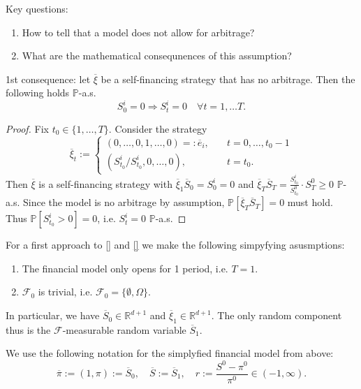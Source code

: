 \begin{prob}Key questions:
\begin{enumerate}
    \item How to tell that a model does not allow for arbitrage? 
    \item What are the mathematical consequnences of this assumption?
\end{enumerate}
\end{prob}

\begin{rem}
1st consequence: let $\overline \xi$ be a self-financing strategy that has no arbitrage. Then the following holds $\mathbb P$-a.s.
$$S_0^i =0 \Rightarrow S_t^i=0\quad\forall t=1,\ldots T.$$
\end{rem}

\begin{proof}
Fix $t_0\in\{1,\ldots,T\}$. Consider the strategy
\begin{equation*}
\overline \xi_t := 
\begin{cases}
(0,\ldots, 0, 1, \ldots, 0) =: \overline e_i,\quad &t=0, \ldots, t_0-1\\
(S_{t_0}^i/S_{t_0}^i, 0, \ldots, 0), & t=t_0.
\end{cases}
\end{equation*}
Then $\overline \xi$ is a self-financing strategy with $\overline \xi_1 \overline S_0 = S_0^i = 0$ and $\overline \xi_T \overline S_T = \frac{S_{t_0}^i}{S_{t_0}^0}\cdot S_T^0\geq 0$ $\mathbb P$-a.s. Since the model is no arbitrage by assumption, $\mathbb P[\overline \xi_T \overline S_T]=0$ must hold. Thus $\mathbb P[S_{t_0}^i>0]=0$, i.e. $S_t^i=0$ $\mathbb P$-a.s.
\end{proof}

\begin{agr}
For a first approach to \ref{} and \ref{} we make the following simpyfying asusmptions:
\begin{enumerate}
    \item The financial model only opens for 1 period, i.e. $T=1$.
    \item $\mathcal F_0$ is trivial, i.e. $\mathcal F_0=\{\emptyset, \Omega\}$.
\end{enumerate}
In particular, we have $\overline S_0\in \mathbb R^{d+1}$ and $\overline \xi_1\in \mathbb R^{d+1}$. The only random component thus is the $\mathcal F$-measurable random variable $\overline S_1$.
\end{agr}

\begin{nota}
We use the following notation for the simplyfied financial model from above:
$$\overline \pi := (1,\pi) := \overline S_0 ,\quad \overline S:= \overline S_1, \quad r:= \frac{S^0 - \pi^0}{\pi^0}\in (-1, \infty).$$
\end{nota}

